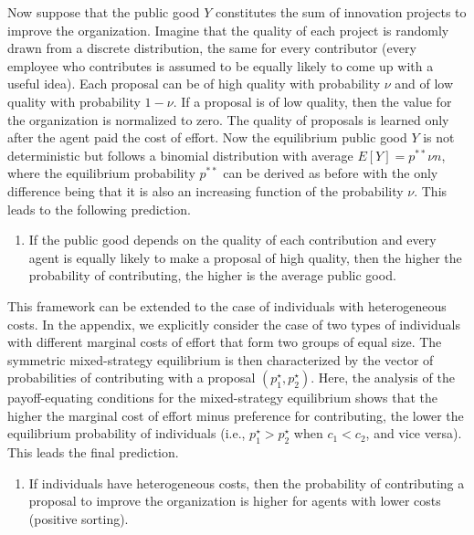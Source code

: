 \documentclass[11pt, titlepage]{article}
\providecommand{\tightlist}{%
  \setlength{\itemsep}{0pt}\setlength{\parskip}{0pt}}
\begin{document}
Now suppose that the public good \(Y\) constitutes the sum of innovation
projects to improve the organization. Imagine that the quality of each
project is randomly drawn from a discrete distribution, the same for
every contributor (every employee who contributes is assumed to be
equally likely to come up with a useful idea). Each proposal can be of
high quality with probability \(\nu\) and of low quality with
probability \(1-\nu\). If a proposal is of low quality, then the value
for the organization is normalized to zero. The quality of proposals is
learned only after the agent paid the cost of effort. Now the
equilibrium public good \(Y\) is not deterministic but follows a
binomial distribution with average \(E[Y] = p^{**} \nu n\), where the
equilibrium probability \(p^{**}\) can be derived as before with the
only difference being that it is also an increasing function of the
probability \(\nu\). This leads to the following prediction.

\begin{enumerate}
\def\labelenumi{\arabic{enumi})}
\setcounter{enumi}{3}
\tightlist
\item
  If the public good depends on the quality of each contribution and
  every agent is equally likely to make a proposal of high quality, then
  the higher the probability of contributing, the higher is the average
  public good.
\end{enumerate}

This framework can be extended to the case of individuals with
heterogeneous costs. In the appendix, we explicitly consider the case of
two types of individuals with different marginal costs of effort that
form two groups of equal size. The symmetric mixed-strategy equilibrium
is then characterized by the vector of probabilities of contributing
with a proposal \((p_1^\star, p_2^\star)\). Here, the analysis of the
payoff-equating conditions for the mixed-strategy equilibrium shows that
the higher the marginal cost of effort minus preference for
contributing, the lower the equilibrium probability of individuals
(i.e., \(p_1^\star > p_2^\star\) when \(c_1 < c_2\), and vice versa).
This leads the final prediction.

\begin{enumerate}
\def\labelenumi{\arabic{enumi})}
\setcounter{enumi}{4}
\tightlist
\item
  If individuals have heterogeneous costs, then the probability of
  contributing a proposal to improve the organization is higher for
  agents with lower costs (positive sorting).
\end{enumerate}
\end{document}
